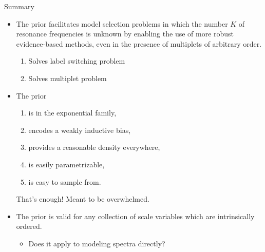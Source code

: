\documentclass[10pt,xcolor={dvipsnames}]{beamer}
\begin{document}
\begin{frame}{Summary}
\pause

\begin{itemize}
\widesep

\item<2-> The prior facilitates model selection problems in which the number $K$ of resonance frequencies is unknown by enabling the use of more robust evidence-based methods, even in the presence of multiplets of arbitrary order.
\begin{enumerate}
\item Solves label switching problem
\item Solves multiplet problem
\end{enumerate}

\item<3-> The prior
\begin{enumerate}
\item is in the exponential family,
\item encodes a weakly inductive bias,
\item provides a reasonable density everywhere,
\item is easily parametrizable,
\item is easy to sample from.
\end{enumerate}
That's enough! Meant to be overwhelmed.

\item<4-> The prior is valid for any collection of scale variables which are intrinsically ordered.
\begin{itemize}
\item Does it apply to modeling spectra directly?
\end{itemize}

\end{itemize}

\end{frame}

\insertreferences

\end{document}

